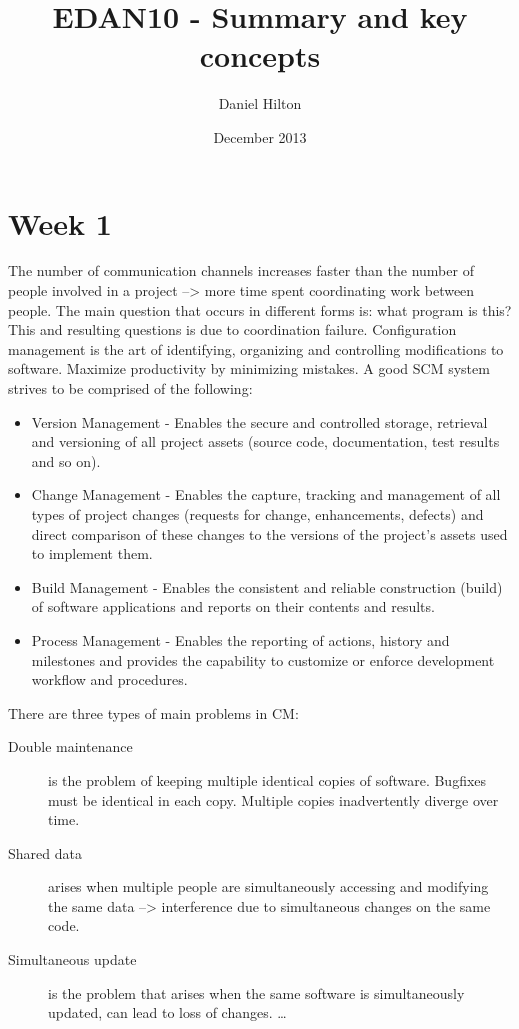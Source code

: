 \documentclass{article}
\title{EDAN10 - Summary and key concepts}
\author{Daniel Hilton}
\date{December 2013}
\begin{document}
\maketitle

\section{Week 1}
The number of communication channels increases faster than the number of people involved in a project -->  more time spent coordinating work between people.
The main question that occurs in different forms is: what program is this? This and resulting questions is due to coordination failure. Configuration management is the art of identifying, organizing and controlling modifications to software. Maximize productivity by minimizing mistakes.
A good SCM system strives to be comprised of the following:
\begin{itemize}
\item Version Management - Enables the secure and controlled storage, retrieval and versioning of all project assets (source code, documentation, test results and so on).
\item Change Management - Enables the capture, tracking and management of all types of project changes (requests for change, enhancements, defects) and direct comparison of these changes to the versions of the project’s assets used to implement them.
\item Build Management - Enables the consistent and reliable construction (build) of software applications and reports on their contents and results.
\item  Process Management - Enables the reporting of actions, history and milestones and provides the capability to customize or enforce development workflow and procedures.
\end{itemize}

There are three types of main problems in CM: \\
\begin{description}
    \item[Double maintenance]
    is the problem of keeping multiple identical copies of software. Bugfixes must be identical in each copy. Multiple copies inadvertently diverge over time.
    \item[Shared data]
    arises when multiple people are simultaneously accessing and modifying the same data --> interference due to simultaneous changes on the same code.
    \item[Simultaneous update] is the problem that arises when the same software is simultaneously updated, can lead to loss of changes. \ldots
\end{description}
\end{document}
